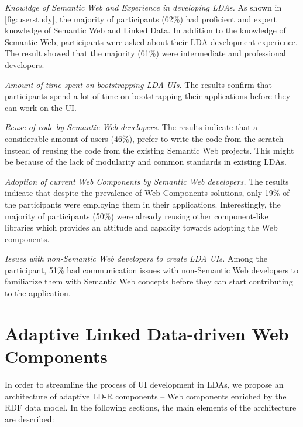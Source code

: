 \documentclass{acm_proc_article-sp}
\begin{document}
\begin{compactitem}

\item
\emph{Knowldge of Semantic Web and Experience in developing LDAs.}
As shown in \autoref{fig:userstudy}, the majority of participants (62\%) had proficient and expert knowledge of Semantic Web and Linked Data.
In addition to the knowledge of Semantic Web, participants were asked about their LDA development experience.
The result showed that the majority (61\%) were intermediate and professional developers. 

\item
\emph{Amount of time spent on bootstrapping LDA UIs.}
 The results confirm that participants spend a lot of time on bootstrapping their applications before they can work on the UI.
 
\item
\emph{Reuse of code by Semantic Web developers.}
The results indicate that a considerable amount of users (46\%), prefer to write the code from the scratch instead of reusing the code from the existing Semantic Web projects.
This might be because of the lack of modularity and common standards in existing LDAs.

\item
\emph{Adoption of current Web Components by Semantic Web developers.}
The results indicate that despite the prevalence of Web Components solutions, only 19\% of the participants were employing them in their applications.
Interestingly, the majority of participants (50\%) were already reusing other component-like libraries which provides an attitude and capacity towards adopting the Web components.

\item
\emph{Issues with non-Semantic Web developers to create LDA UIs.}
Among the participant, 51\% had communication issues with non-Semantic Web developers to familiarize them with Semantic Web concepts before they can start contributing to the application.

\end{compactitem}

\section{Adaptive Linked Data-driven Web Components}
In order to streamline the process of UI development in LDAs, we propose an architecture of adaptive LD-R components -- Web components enriched by the RDF data model.
In the following sections, the main elements of the architecture are described:
\end{document}
